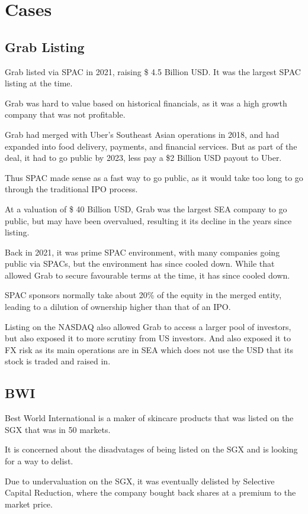 \section{Cases}
\subsection{Grab Listing}
Grab listed via SPAC in 2021, raising \$ 4.5 Billion USD. It was the largest SPAC listing at the time.

Grab was hard to value based on historical financials, as it was a high growth company that was not profitable.

Grab had merged with Uber's Southeast Asian operations in 2018, and had expanded into food delivery, payments, and financial services. But as part of the deal, it had to go public by 2023, less pay a \$2 Billion USD payout to Uber.

Thus SPAC made sense as a fast way to go public, as it would take too long to go through the traditional IPO process.

At a valuation of \$ 40 Billion USD, Grab was the largest SEA company to go public, but may have been overvalued, resulting it its decline in the years since listing.

Back in 2021, it was prime SPAC environment, with many companies going public via SPACs, but the environment has since cooled down. While that allowed Grab to secure favourable terms at the time, it has since cooled down.

SPAC sponsors normally take about 20\% of the equity in the merged entity, leading to a dilution of ownership higher than that of an IPO.

Listing on the NASDAQ also allowed Grab to access a larger pool of investors, but also exposed it to more scrutiny from US investors. And also exposed it to FX risk as its main operations are in SEA which does not use the USD that its stock is traded and raised in.

\subsection{BWI}
Best World International is a maker of skincare products that was listed on the SGX that was in 50 markets.

It is concerned about the disadvatages of being listed on the SGX and is looking for a way to delist.

Due to undervaluation on the SGX, it was eventually delisted by Selective Capital Reduction, where the company bought back shares at a premium to the market price.

